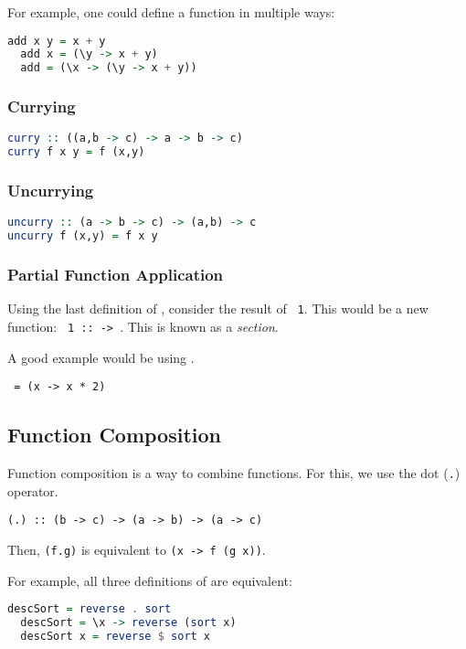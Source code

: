 For example, one could define a function \texttt{} in multiple ways:
\begin{lstlisting}[language=haskell]
  add x y = x + y
  add x = (\y -> x + y)
  add = (\x -> (\y -> x + y))
\end{lstlisting}

\subsubsection{Currying}
\begin{lstlisting}[language=haskell]
curry :: ((a,b -> c) -> a -> b -> c)
curry f x y = f (x,y)
\end{lstlisting}

\subsubsection{Uncurrying}
\begin{lstlisting}[language=haskell]
uncurry :: (a -> b -> c) -> (a,b) -> c
uncurry f (x,y) = f x y
\end{lstlisting}

\subsubsection{Partial Function Application}
Using the last definition of \texttt{}, consider the result of \texttt{ 1}. This would be a new function: \texttt{ 1 ::  -> }. This is known as a \textit{section}.

A good example would be using \texttt{}.
\begin{center}
  \texttt{ =  (x -> x * 2)}
\end{center}

\subsection{Function Composition}
Function composition is a way to combine functions. For this, we use the dot (\texttt{.}) operator.
\begin{center}
  \texttt{(.) :: (b -> c) -> (a -> b) -> (a -> c)}
\end{center}
Then, \texttt{(f.g)} is equivalent to \texttt{(x -> f (g x))}.

For example, all three definitions of \texttt{} are equivalent:
\begin{lstlisting}[language=haskell]
  descSort = reverse . sort
  descSort = \x -> reverse (sort x)
  descSort x = reverse $ sort x
\end{lstlisting}
